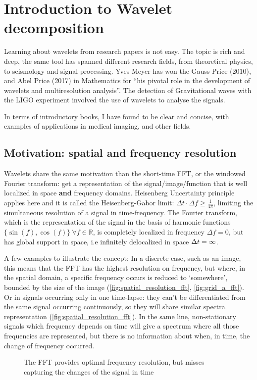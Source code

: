 \documentclass{InsightArticle}
\theoremstyle{definition}
\newcommand{\IJhandlerIDnumber}{3558}
\begin{document}
\IJhandlenote{\IJhandlerIDnumber}

\tableofcontents

\section{Introduction to Wavelet decomposition}
\label{sec:Intro}
Learning about wavelets from research papers is not easy. The topic is rich and deep, the same tool has spanned different research fields, from theoretical physics, to seismology and signal processing.
Yves Meyer has won the Gauss Price (2010), and Abel Price (2017) in Mathematics for ``his pivotal role in the development of wavelets and multiresolution analysis''. The detection of Gravitational waves with the LIGO experiment involved the use of wavelets to analyse the signals.

In terms of introductory books, I have found \cite{addison_illustrated_2002} to be clear and concise, with examples of applications in medical imaging, and other fields.

\subsection{Motivation: spatial and frequency resolution}
\label{sub:Motivation}
Wavelets share the same motivation than the short-time FFT, or the windowed Fourier transform: get a representation of the signal/image/function that is well localized in space \textbf{and} frequency domains. Heisenberg Uncertainty principle applies here and it is called the Heisenberg-Gabor limit: $\Delta t \cdot \Delta f \geq \frac{1}{4\pi}$, limiting the simultaneous resolution of a signal in time-frequency.
The Fourier transform, which is the representation of the signal in the basis of harmonic functions $\{\sin(f),\cos(f)\}\ \forall f \in \mathbb{R}$, is completely localized in frequency $\Delta f = 0$, but has global support in space, i.e infinitely delocalized in space $\Delta t = \infty$.

A few examples to illustrate the concept: In a discrete case, such as an image, this means that the FFT has the highest resolution on frequency, but where, in the spatial domain, a specific frequency occurs is reduced to `somewhere', bounded by the size of the image (\autoref{fig:spatial_resolution_fft}, \ref{fig:grid_a_fft}).
Or in signals occurring only in one time-lapse: they can't be differentiated from the same signal occurring continuously, so they will share similar spectra representation (\autoref{fig:spatial_resolution_fft}). In the same line, non-stationary signals which frequency depends on time will give a spectrum where all those frequencies are represented, but there is no information about when, in time, the change of frequency occurred.
\begin{figure}[H]
  \centering
  \resizebox{0.9\textwidth}{!}{}
  \caption{The FFT provides optimal frequency resolution, but misses capturing the changes of the signal in time}
  \label{fig:spatial_resolution_fft}
\end{figure}
\end{document}
